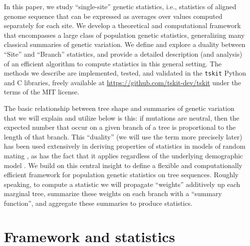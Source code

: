 \documentclass{article}
\newcommand{\tskit}{{\texttt{tskit}}}
\begin{document}
In this paper, we study ``single-site'' genetic statistics,
i.e., statistics of aligned genome sequence that can be expressed as averages over values computed
separately for each site. We develop a theoretical and computational framework
that encompasses a large class of population genetic statistics, generalizing
many classical summaries of genetic variation. We define
and explore a duality between ``Site'' and ``Branch'' statistics, and
provide a detailed description (and analysis) of an efficient algorithm
to compute statistics in this general setting.
The methods we describe are implemented, tested, and validated in the \tskit{}
Python and C libraries, freely available at \url{https://github.com/tskit-dev/tskit}
under the terms of the MIT license.

The basic relationship between tree shape and summaries of genetic variation
that we will explain and utilize below is this:
if mutations are neutral, then the expected number that occur on a
given branch of a tree is proportional to the length of that branch.
This ``duality'' (we will use the term more precisely later) has been
used extensively in deriving properties of statistics in models of random mating
\citep[e.g.,][]{tajima1983evolutionary,tavare1984lineofdescent,fu1995statistical},
as has the fact that it applies regardless of the underlying demographic model
\citep[e.g.,][]{gillespie1979evolutionary,hudson1983properties,slatkin1991inbreeding,
mcvean2002genealogical,lohse2016efficient,ralph2019empirical}. We build on this central
insight to define a flexible and computationally efficient framework for
population genetic statistics on tree sequences.
Roughly speaking, to compute a statistic we will
propagate ``weights'' additively up each marginal tree,
summarize these weights on each branch with a ``summary function'',
and aggregate these summaries to produce statistics.

\section*{Framework and statistics}
\end{document}
